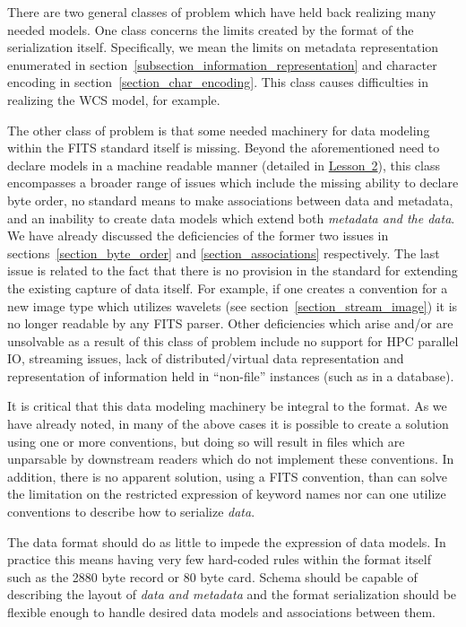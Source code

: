 \documentclass[final,authoryear,5p,times,twocolumn]{elsarticle}
\begin{document}
{{There are two general classes of problem which have held back realizing
many needed models. One class concerns the limits created by the format
of the serialization itself. Specifically, we mean the limits on metadata 
representation enumerated in section~\ref{subsection_information_representation}
and character encoding in section~\ref{section_char_encoding}.
This class causes difficulties in realizing the WCS model, for example.


The other class of problem is that some needed machinery for data modeling
within the FITS standard itself is missing. Beyond the aforementioned need to
declare models in a machine readable manner (detailed in
\hyperref[section_lesson_2]{Lesson~2}), this class encompasses a broader range
of issues which include the missing ability to declare byte order, 
no standard means to make associations between data and metadata, and 
an inability to create data models which extend both
\textit{metadata and the data}. We have already discussed the deficiencies of
the former two issues in sections~\ref{section_byte_order} and
\ref{section_associations} respectively.  The last issue is related to the fact
that there is no provision in the standard for extending the existing capture
of data itself. For example, if one creates a convention for a new image type
which utilizes wavelets (see section~\ref{section_stream_image}) it is no
longer readable by any FITS parser. Other deficiencies which arise and/or are
unsolvable as a result of this class of problem include no support for HPC
parallel IO, streaming issues, lack of distributed/virtual data representation
and representation of information held in ``non-file'' instances (such as in a
database).


It is critical that this data modeling machinery be integral to the format.
As we have already noted, in many of the above cases it is possible to 
create a solution using one or more conventions, but doing so will
result in files which are unparsable by downstream readers which
do not implement these conventions. In addition, there is no apparent 
solution, using a FITS convention, than can solve the limitation on the
restricted expression of keyword names nor can one utilize conventions
to describe how to serialize \textit{data}.


The data format should do as little to impede the expression of data 
models.  In practice this means having very few hard-coded rules
within the format itself such as the 2880 byte record or 80 byte card.
Schema should be capable of describing the layout of \textit{data and metadata}
 and the format serialization should be flexible enough to handle 
desired data models and associations between them.


}}
\end{document}

